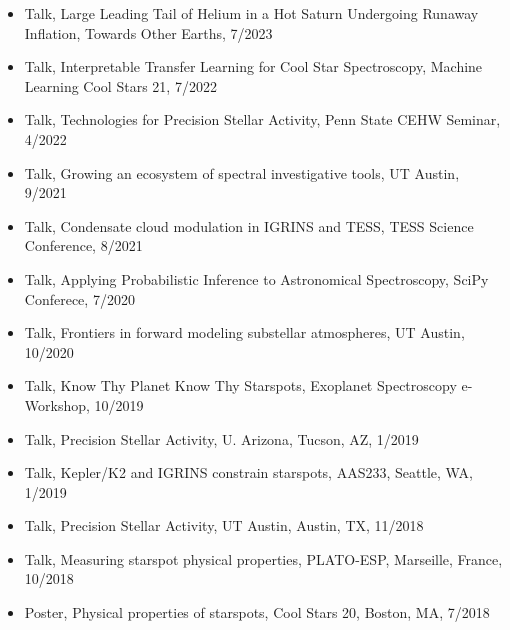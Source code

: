 \documentclass[10pt,letterpaper]{article}
\begin{document}
\begin{itemize}


    \item Talk, \href{https://speakerdeck.com/gully/a-large-and-variable-leading-tail-of-helium-in-a-hot-saturn-undergoing-runaway-inflation}{\faSpeakerDeck} Large Leading Tail of Helium in a Hot Saturn Undergoing Runaway Inflation, Towards Other Earths, 7/2023
    \item Talk, \href{https://speakerdeck.com/gully/blase-an-interpretable-transfer-learning-approach-to-cool-star-echelle-spectroscopy}{\faSpeakerDeck} Interpretable Transfer Learning for Cool Star Spectroscopy, Machine Learning Cool Stars 21, 7/2022
    \item Talk, Technologies for Precision Stellar Activity, Penn State CEHW Seminar, 4/2022
    \item Talk, Growing an ecosystem of spectral investigative tools, UT Austin, 9/2021
    \item Talk, \href{https://youtu.be/0yLgE_8YsIM?t=130}{\faYoutube} Condensate cloud modulation in IGRINS and TESS, TESS Science Conference, 8/2021
    \item Talk, \href{https://youtu.be/ME7kSjPe7mM}{\faYoutube} Applying Probabilistic Inference to Astronomical Spectroscopy, SciPy Conferece, 7/2020
    \item Talk, \href{https://speakerdeck.com/gully/frontiers-in-forward-modeling-substellar-atmospheres}{\faSpeakerDeck} Frontiers in forward modeling substellar atmospheres, UT Austin, 10/2020
    \item Talk, \href{https://speakerdeck.com/gully/know-thy-planet-know-thy-starspots}{\faSpeakerDeck} Know Thy Planet Know Thy Starspots, Exoplanet Spectroscopy e-Workshop, 10/2019
    \item Talk, Precision Stellar Activity, U. Arizona, Tucson, AZ, 1/2019
    \item Talk, \href{https://speakerdeck.com/gully/k2-and-igrins-constrain-starspot-filling-factors-and-temperatures}{\faSpeakerDeck} Kepler/K2 and IGRINS constrain starspots, AAS233, Seattle, WA, 1/2019
    \item Talk, Precision Stellar Activity, UT Austin, Austin, TX, 11/2018
    \item Talk, \href{https://speakerdeck.com/gully/k2-and-high-resolution-near-ir-spectroscopy}{\faSpeakerDeck} Measuring starspot physical properties, PLATO-ESP, Marseille, France, 10/2018
    \item Poster, Physical properties of starspots, Cool Stars 20, Boston, MA, 7/2018

\end{itemize}
\end{document}
